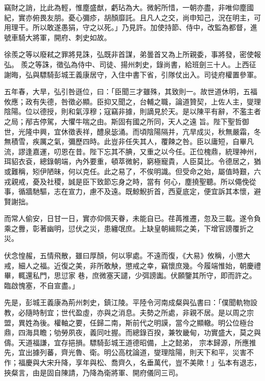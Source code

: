 \begin{pinyinscope}
 竊財之誚，比此為輕，惟塵盛猷，虧玷為大。微躬所惜，一朝亦盡，非唯仰塵國紀，實亦俯畏友朋。憂心彌疹，胡顏靡託。且凡人之交，尚申知己，況在明主，可用理干。所以敢遂愚狷，守之以死。」乃見許。加使持節、侍中，改監為都督，進號車騎大將軍，開府、刺史如故。



 徐羨之等以廢弒之罪將見誅，弘既非首謀，弟曇首又為上所親委，事將發，密使報弘。
 羨之等誅，徵弘為侍中、司徒、揚州刺史，錄尚書，給班劍三十人。上西征謝晦，弘與驃騎彭城王義康居守，入住中書下省，引隊仗出入。司徒府權置參軍。



 五年春，大旱，弘引咎遜位，曰：「臣聞三才雖殊，其致則一。故世道休明，五福攸應；政有失德，咎徵必顯。臣抑又聞之，台輔之職，論道贊契，上佐人主，燮理陰陽。位以德授，則和氣淳穆；寇竊非據，則謫見於天。是以陳平有辭，不濫主者之局；邴吉停駕，大懼牛喘之由。斯固有國之所同，天人之遠
 旨。陛下聖哲御世，光隆中興，宜休徵表祥，醴泉毖涌。而頃陰陽隔并，亢旱成災，秋無嚴霜，冬無積雪，疾厲之氣，彌歷四時。此豈非任失其人，覆餗之咎。臣以庸短，自畢凡流，謬逢嘉運，叨恩在昔。陛下忘其不腆，又重之以今任。正位槐鼎，統理神州，珥貂衣袞，總錄朝端，內外要重，頓萃微躬，窮極寵貴，人臣莫比。令德居之，猶或難稱，矧伊陋昧，何以克任。此之易了，不俟明識。但受命之始，屬值時艱，六戎親戒，憂及社稷，誠是臣下致節忘身之時，當有
 何心，塵撓聖聽。所以僶俛從事，循牆馳驅，志在宣力，慮不及遠。既鯨鯢折首，西夏底定，便宜訴其本懷，避賢謝拙。



 而常人偷安，日甘一日，實亦仰佩天眷，未能自已。荏苒推遷，忽及三載。遂令負乘之釁，彰著幽明，愆伏之災，患纏氓庶。上缺皇朝緝熙之美，下增官謗覆折之災。



 伏念惶赧，五情飛散，雖曰厚顏，何以寧處。不遠而復，《大易》攸稱，小懲大戒，細人之福。近復之美，非所敢觖，懲戒之幸，竊懷庶幾。今履端惟始，朝慶禮畢，輒還私門，思愆家
 巷，庶微塞天譴，少弭謗讟。伏願鑒其所守，即而許之。臨啟愧塞，不自宣盡。」



 先是，彭城王義康為荊州刺史，鎮江陵。平陸令河南成粲與弘書曰：「僕聞軌物設教，必隨時制宜；世代盈虛，亦與之消息。夫勢之所處，非親不居。是以周之宗盟，異姓為後。權軸之要，任歸二南，斯前代之明謨，當今之顯轍。明公位極台鼎，四海具瞻；劬勞夙夜，義同吐握。而總錄百揆，兼牧畿甸，功實盛大，莫之與儔。天道福謙，宜存挹損。驃騎彭城王道德昭備，上之懿弟，
 宗本歸源，所應推先，宜出據列蕃，齊光魯、衛。明公高枕論道，燮理陰陽，則天下和平，災害不作；福慶與大宋升降，享年與松、喬齊久，名垂萬代，豈不美歟！」弘本有退志，挾粲言，由是固自陳請，乃降為衛將軍、開府儀同三司。




\end{pinyinscope}
